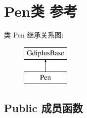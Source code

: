 \hypertarget{class_pen}{}\section{Pen类 参考}
\label{class_pen}
类 Pen 继承关系图\+:\begin{figure}[H]
\begin{center}
\leavevmode
\includegraphics[height=2.000000cm]{class_pen}
\end{center}
\end{figure}
\subsection*{Public 成员函数}

